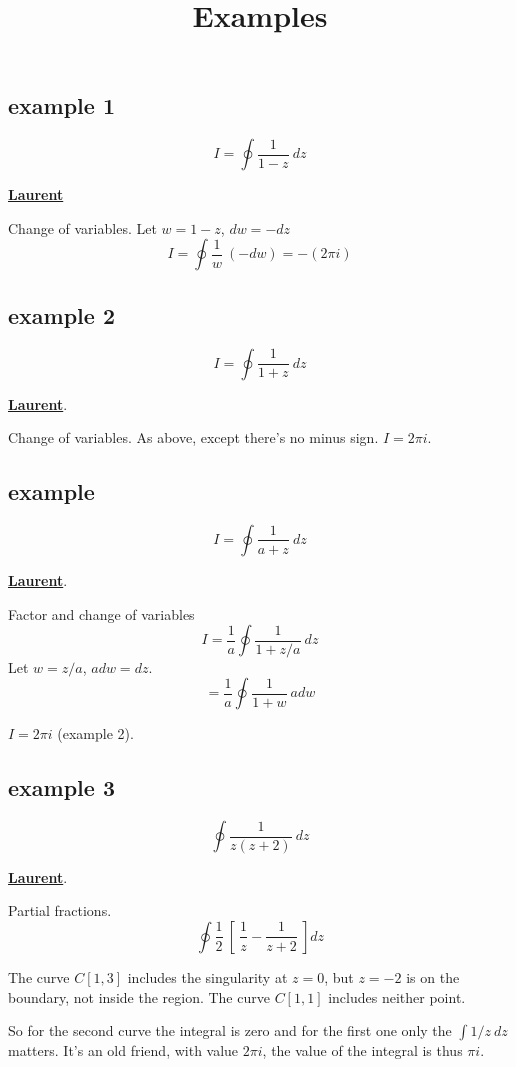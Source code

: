 \documentclass[11pt, oneside]{article}
\title{Examples}
\date{}
\begin{document}
\maketitle
\Large


\subsection*{example 1}
\[ I = \oint \frac{1}{1 - z} \ dz \]

\hyperref[sec:series_cheatsheet]{\textbf{Laurent}}

Change of variables.  Let $w = 1 - z$, $dw = - dz$
\[ I = \oint \frac{1}{w} \ (- dw) = - (2 \pi i) \]

\subsection*{example 2}
\[ I = \oint \frac{1}{1 + z} \ dz \]

\hyperref[sec:series_cheatsheet]{\textbf{Laurent}}.

Change of variables.  As above, except there's no minus sign.  $I =  2 \pi i$.

\subsection*{example}
\[ I = \oint \frac{1}{a + z} \ dz \]

\hyperref[sec:a_plus_z]{\textbf{Laurent}}.

Factor and change of variables 
\[ I = \frac{1}{a} \oint \frac{1}{1 + z/a} \ dz \]
Let $w = z/a$, $a dw = dz$.
\[ = \frac{1}{a} \oint \frac{1}{1 + w} \ a dw \]

$ I = 2 \pi i$ (example 2).

\subsection*{example 3}
\[ \oint \frac{1}{z(z + 2)} \ dz \]

\hyperref[sec:ex3L]{\textbf{Laurent}}.

Partial fractions.
\[ \oint \frac{1}{2} \ [ \ \frac{1}{z} - \frac{1}{z + 2} \ ] dz \]

The curve $C[1,3]$ includes the singularity at $z = 0$, but $z = -2$ is on the boundary, not inside the region.  The curve $C[1,1]$ includes neither point.

So for the second curve the integral is zero and for the first one only the $\int 1/z \ dz$ matters.  It's an old friend, with value $2 \pi i$, the value of the integral is thus $\pi i$.
\end{document}
